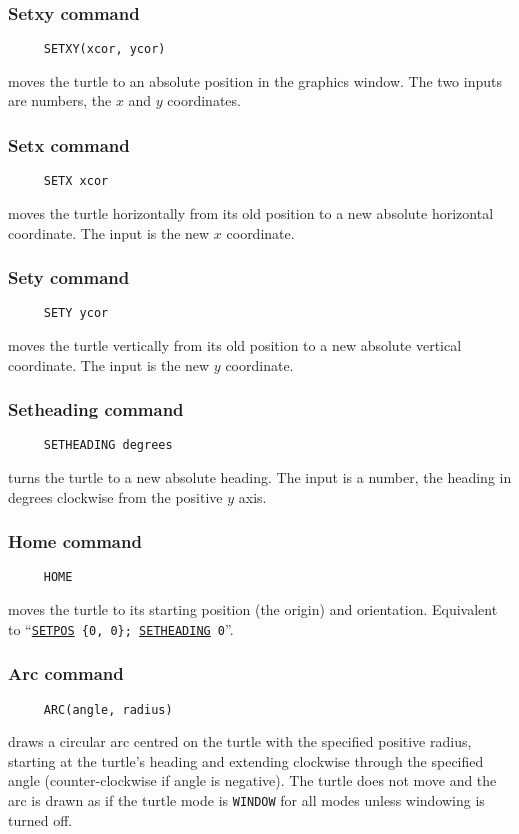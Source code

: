 \subsubsection*{Setxy command}
\begin{verbatim}
     SETXY(xcor, ycor)
\end{verbatim}
moves the turtle to an absolute position in the graphics window.  The
two inputs are numbers, the $x$ and $y$ coordinates.

\subsubsection*{Setx command}
\begin{verbatim}
     SETX xcor
\end{verbatim}
moves the turtle horizontally from its old position to a new absolute
horizontal coordinate.  The input is the new $x$ coordinate.

\subsubsection*{Sety command}
\begin{verbatim}
     SETY ycor
\end{verbatim}
moves the turtle vertically from its old position to a new absolute
vertical coordinate.  The input is the new $y$ coordinate.

\subsubsection*{Setheading command}
\begin{verbatim}
     SETHEADING degrees
\end{verbatim}
\label{logoturtle:setheading}
turns the turtle to a new absolute heading.  The input is a number,
the heading in degrees clockwise from the positive $y$ axis.

\subsubsection*{Home command}
\begin{verbatim}
     HOME
\end{verbatim}
\label{logoturtle:home}
moves the turtle to its starting position (the origin) and orientation.
Equivalent to ``\texttt{\hyperref[logoturtle:setpos]{SETPOS}~\{0,~0\};
  \hyperref[logoturtle:setheading]{SETHEADING}~0}''.

\subsubsection*{Arc command}
\begin{verbatim}
     ARC(angle, radius)
\end{verbatim}
draws a circular arc centred on the turtle with the specified positive
radius, starting at the turtle's heading and extending clockwise
through the specified angle (counter-clockwise if angle is negative).
The turtle does not move and the arc is drawn as if the turtle mode is
\texttt{WINDOW} for all modes unless windowing is turned off.

